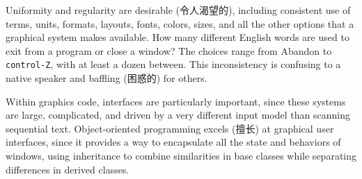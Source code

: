 Uniformity and regularity are desirable (令人渴望的), including consistent
use of terms, units, formats, layouts, fonts, colors, sizes, and all the
other options that a graphical system makes available. How many different
English words are used to exit from a program or close a window? The
choices range from Abandon to \verb'control-Z', with at least a dozen
between. This inconsistency is confusing to a native speaker and baffling
(困惑的) for others.

Within graphics code, interfaces are particularly important, since these
systems are large, complicated, and driven by a very different input model
than scanning sequential text. Object-oriented programming excels (擅长) at
graphical user interfaces, since it provides a way to encapsulate all the
state and behaviors of windows, using inheritance to combine similarities
in base classes while separating differences in derived classes.

